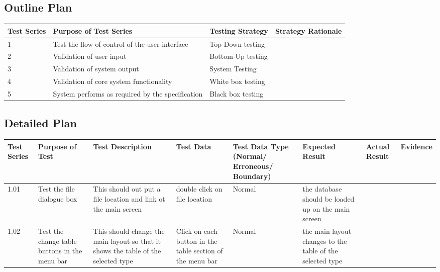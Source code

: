 \begin{landscape}
\subsection{Outline Plan}

\begin{center}
    \begin{tabular}{|p{2cm}|p{5cm}|p{5cm}|p{4cm}|}
        \hline
        \textbf{Test Series} & \textbf{Purpose of Test Series} & \textbf{Testing Strategy} & \textbf{Strategy Rationale}\\ \hline
        1 & Test the flow of control of the user interface  & Top-Down testing &  \\ \hline
        2 & Validation of user input & Bottom-Up testing &  \\ \hline
        3 & Validation of system output & System Testing & \\ \hline
        4 & Validation of core system functionality & White box testing & \\ \hline
        5 & System performs as required by the specification & Black box testing & \\ \hline
    \end{tabular}
\end{center}

\subsection{Detailed Plan}

\begin{center}
    \begin{longtable}{|p{1.5cm}|p{2.5cm}|p{2.5cm}|p{2cm}|p{2cm}|p{2cm}|p{2cm}|p{2cm}|}
        \hline
        \textbf{Test Series} & \textbf{Purpose of Test} & \textbf{Test Description} & \textbf{Test Data} & \textbf{Test Data Type (Normal/ Erroneous/ Boundary)} & \textbf{Expected Result} & \textbf{Actual Result} & \textbf{Evidence}\\ \hline
        1.01 & Test the file dialogue box & This should out put a file location and link ot the main screen & double click on file location & Normal & the database should be loaded up on the main screen &  &  \\ \hline
        
        1.02 & Test the change table buttons in the menu bar  & This should change the main layout so that it shows the table of the selected type & Click on each button in the table section of the menu bar & Normal & the main layout changes to the table of the selected type & & \\ \hline
        

\end{longtable}
\end{center}
\end{landscape}
